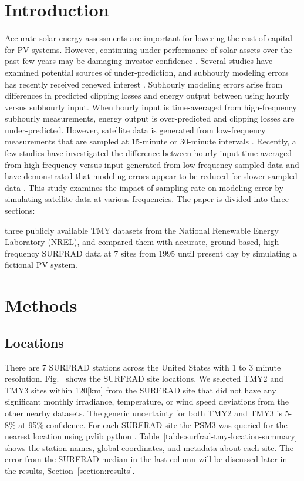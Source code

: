 \documentclass[conference]{IEEEtran}
\begin{document}
\section{Introduction}
Accurate solar energy assessments are important for lowering the cost of capital for PV systems. However, continuing under-performance of solar assets over the past few years may be damaging investor confidence \cite{Matsui2021}. Several studies have examined potential sources of under-prediction, and subhourly modeling errors has recently received renewed interest \cite{Parikh2021,Anderson2020,Bradford2020,Kharait2020,Cormode2019}. Subhourly modeling errors arise from differences in predicted clipping losses and energy output between using hourly versus subhourly input. When hourly input is time-averaged from high-frequency subhourly measurements, energy output is over-predicted and clipping losses are under-predicted. However, satellite data is generated from low-frequency measurements that are sampled at 15-minute or 30-minute intervals \cite{Wilcox2012,Sengupta2018}. Recently, a few studies have investigated the difference between hourly input time-averaged from high-frequency versus input generated from low-frequency sampled data and have demonstrated that modeling errors appear to be reduced for slower sampled data \cite{Bowersox2021}. This study examines the impact of sampling rate on modeling error by simulating satellite data at various frequencies. The paper is divided into three sections:

three publicly available TMY datasets from the National Renewable Energy Laboratory (NREL), and compared them with accurate, ground-based, high-frequency SURFRAD data at 7 sites from 1995 until present day \cite{Augustine2000} by simulating a fictional PV system.

\section{Methods}
\subsection{Locations}
There are 7 SURFRAD stations \cite{Augustine2000} across \cite{Bowersox2021} the United States with 1 to 3 minute resolution. Fig.~ shows the SURFRAD site locations. We selected TMY2 \cite{Marion1995} and TMY3 \cite{Wilcox2012} sites within 120[km] from the SURFRAD site that did not have any significant monthly irradiance, temperature, or wind speed deviations from the other nearby datasets. The generic uncertainty for both TMY2 and TMY3 is 5-8\% at 95\% confidence. For each SURFRAD site the PSM3 was queried for the nearest location using pvlib python \cite{F.Holmgren2018}. Table~\ref{table:surfrad-tmy-location-summary} shows the station names, global coordinates, and metadata about each site. The error from the SURFRAD median in the last column will be discussed later in the results, Section~\ref{section:results}.
\end{document}
